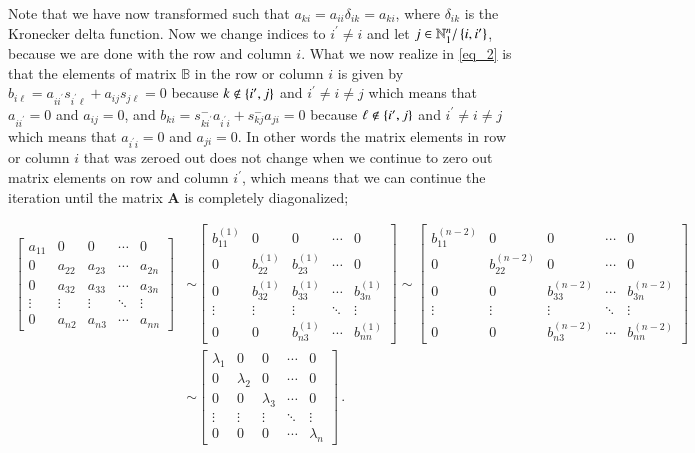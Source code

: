 \documentclass[11pt,english,a4paper]{article}
\begin{document}
\begin{flushleft}
Note that we have now transformed such that $a_{ki} = a_{ii}\delta_{ik} = a_{ki}$, where $\delta_{ik}$ is the Kronecker delta function. Now we change indices to $i^\prime\neq i$ and let $j\in\mathbb{N}_1^n / \left\lbrace{i,i'}\right\rbrace$, because we are done with the row and column $i$.  What we now realize in \eqref{eq_2} is that the elements of matrix $\mathbb{B}$ in the row or column $i$ is given by  $b_{i\ell}= a_{ii^\prime} s_{i^\prime \ell} + a_{ij} s_{j\ell} = 0$ because $k\not\in\left\lbrace{i^\prime, j}\right\rbrace$ and $i^\prime \neq i \neq j$ which means that $a_{ii^\prime}=0$ and $a_{ij}=0$, and $b_{ki} = s_{ki^\prime}^- a_{i^\prime i} + s_{kj}^- a_{ji} = 0$ because $\ell\not\in\left\lbrace{i^\prime, j}\right\rbrace$ and $i^\prime \neq i \neq j$ which means that $a_{i^\prime i} = 0$ and $a_{ji} = 0$. In other words the matrix elements in row or column $i$ that was zeroed out does not change when we continue to zero out matrix elements on row and column $i^\prime$, which means that we can continue the iteration until the matrix $\mathbf{A}$ is completely diagonalized;

\begin{align*}
\begin{bmatrix} a_{11} & 0 & 0 & \cdots & 0 \\ 0 & a_{22} & a_{23} & \cdots & a_{2n} \\ 0 & a_{32} & a_{33} & \cdots & a_{3n} \\ \vdots & \vdots & \vdots & \ddots & \vdots \\ 0 & a_{n2} & a_{n3} & \cdots & a_{nn} \end{bmatrix}
&\sim \begin{bmatrix} b_{11}^{(1)} & 0 & 0 & \cdots & 0 \\ 0 & b_{22}^{(1)} & b_{23}^{(1)} & \cdots & 0 \\ 0 & b_{32}^{(1)} & b_{33}^{(1)} & \cdots & b_{3n}^{(1)} \\ \vdots & \vdots & \vdots & \ddots & \vdots \\ 0 & 0 & b_{n3}^{(1)} & \cdots & b_{nn}^{(1)} \end{bmatrix}
\sim \begin{bmatrix} b_{11}^{(n-2)} & 0 & 0 & \cdots & 0 \\ 0 & b_{22}^{(n-2)} & 0 & \cdots & 0 \\ 0 & 0 & b_{33}^{(n-2)} & \cdots & b_{3n}^{(n-2)} \\ \vdots & \vdots & \vdots & \ddots & \vdots \\ 0 & 0 & b_{n3}^{(n-2)} & \cdots & b_{nn}^{(n-2)} \end{bmatrix}
\\
&\sim \begin{bmatrix} \lambda_1 & 0 & 0 & \cdots & 0 \\ 0 & \lambda_2 & 0 & \cdots & 0 \\ 0 & 0 & \lambda_3 & \cdots & 0 \\ \vdots & \vdots & \vdots & \ddots & \vdots \\ 0 & 0 & 0 & \cdots & \lambda_n \end{bmatrix} \,.
\end{align*}


\end{flushleft}
\end{document}
